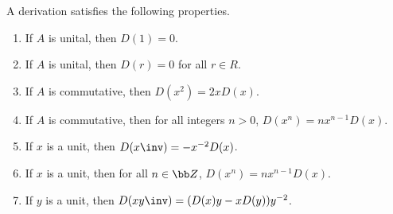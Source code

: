 \begin{proposition}
  \label{prop_derivation}
  A derivation satisfies the following properties.
  \begin{enumerate}[label=(\roman*)]
    \item If $A$ is unital, then $D(1) = 0$.
    \item If $A$ is unital, then $D(r) = 0$ for all $r \in R$.
    \item If $A$ is commutative, then $D(x^2) = 2xD(x)$.
    \item If $A$ is commutative, then for all integers $n > 0$, $D(x^n) = nx^{n-1}D(x)$.
    \item If $x$ is a unit, then $D(x\inv) = -x^{-2}D(x)$.
    \item If $x$ is a unit, then for all $n \in \bb Z$, $D(x^n) = nx^{n-1}D(x)$.
    \item If $y$ is a unit, then $D(xy\inv) = (D(x)y - xD(y))y^{-2}$.
  \end{enumerate}
\end{proposition}
